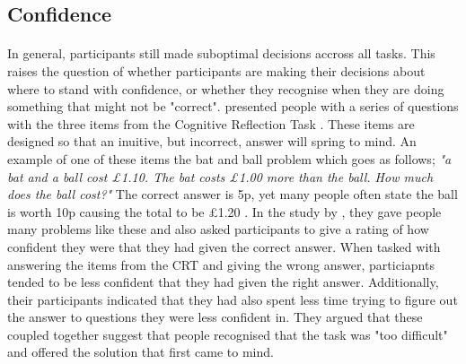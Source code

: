 \documentclass[12pt]{article}
\begin{document}
\subsection*{Confidence}
\paragraph{} In general, participants still made suboptimal decisions accross all tasks. This raises the question of whether participants are making their decisions about where to stand with confidence, or whether they recognise when they are doing something that might not be "correct". \cite{SZOLLOSI20171} presented people with a series of questions with the three items from the Cognitive Reflection Task \citep[CRT: ][]{Frederick2005CRT}. These items are designed so that an inuitive, but incorrect, answer will spring to mind. An example of one of these items the bat and ball problem which goes as follows; \textit{"a bat and a ball cost \pounds1.10. The bat costs \pounds1.00 more than the ball. How much does the ball cost?"} The correct answer is 5p, yet many people often state the ball is worth 10p causing the total to be \pounds1.20 \citep{Frederick2005CRT}. In the study by \cite{SZOLLOSI20171}, they gave people many problems like these and also asked participants to give a rating of how confident they were that they had given the correct answer. When tasked with answering the items from the CRT and giving the wrong answer, particiapnts tended to be less confident that they had given the right answer. Additionally, their participants indicated that they had also spent less time trying to figure out the answer to questions they were less confident in. They argued that these coupled together suggest that people recognised that the task was "too difficult" and offered the solution that first came to mind. 
\end{document}
